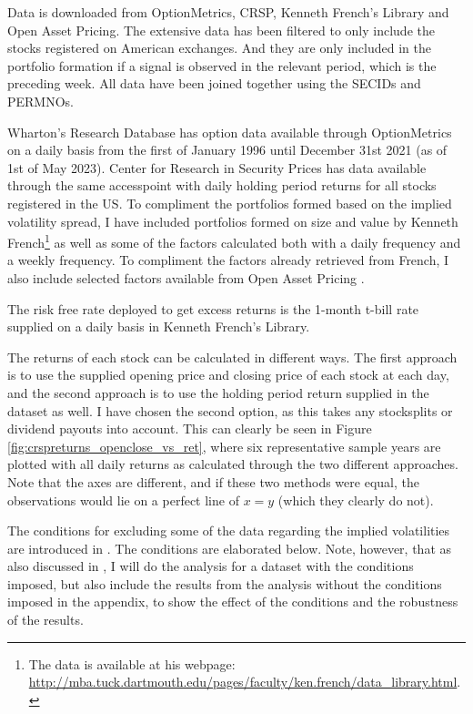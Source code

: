 
Data is downloaded from OptionMetrics, CRSP, Kenneth French's Library and Open Asset Pricing. The extensive data has been filtered to only include the stocks registered on American exchanges. And they are only included in the portfolio formation if a signal is observed in the relevant period, which is the preceding week. All data have been joined together using the SECIDs and PERMNOs.

Wharton's Research Database has option data available through OptionMetrics on a daily basis from the first of January 1996 until December 31st 2021 (as of 1st of May 2023). Center for Research in Security Prices has data available through the same accesspoint with daily holding period returns for all stocks registered in the US. To compliment the portfolios formed based on the implied volatility spread, I have included portfolios formed on size and value by Kenneth French\footnote{The data is available at his webpage: \url{http://mba.tuck.dartmouth.edu/pages/faculty/ken.french/data_library.html}.} as well as some of the factors calculated both with a daily frequency and a weekly frequency. To compliment the factors already retrieved from French, I also include selected factors available from Open Asset Pricing \citep{chen_zimmermann}. 

The risk free rate deployed to get excess returns is the 1-month t-bill rate supplied on a daily basis in Kenneth French's Library. 

The returns of each stock can be calculated in different ways. The first approach is to use the supplied opening price and closing price of each stock at each day, and the second approach is to use the holding period return supplied in the dataset as well. I have chosen the second option, as this takes any stocksplits or dividend payouts into account. This can clearly be seen in Figure \ref{fig:crspreturns_openclose_vs_ret}, where six representative sample years are plotted with all daily returns as calculated through the two different approaches. Note that the axes are different, and if these two methods were equal, the observations would lie on a perfect line of $x=y$ (which they clearly do not).

The conditions for excluding some of the data regarding the implied volatilities are introduced in \cite{cremers2010deviations}. The conditions are elaborated below. Note, however, that as also discussed in \cite{shang2016option}, I will do the analysis for a dataset with the conditions imposed, but also include the results from the analysis without the conditions imposed in the appendix, to show the effect of the conditions and the robustness of the results. 

